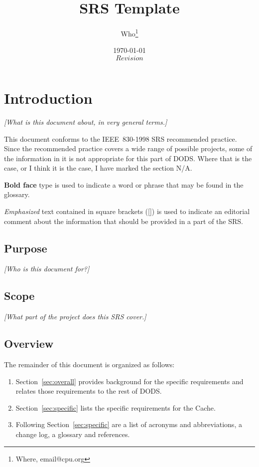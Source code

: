 \documentclass{article}
\begin{document}
\title{SRS Template}
\author{Who\thanks{Where, email@cpu.org}}
\date{\today \\ $Revision$ }



\maketitle
\tableofcontents


\section{Introduction}
\emph{[What is this document about, in very general terms.]}

This document conforms to the IEEE~830-1998 \ac{SRS} recommended practice.
Since the recommended practice covers a wide range of possible projects, some
of the information in it is not appropriate for this part of \acs{DODS}.
Where that is the case, or I think it is the case, I have marked the section
N/A.

\textbf{Bold face} type is used to indicate a word or phrase that may be
found in the glossary.

\emph{Emphasized} text contained in square brackets ([]) is used to indicate
an editorial comment about the information that should be provided in a part
of the \ac{SRS}.

\subsection{Purpose}
\emph{[Who is this document for?]}

\subsection{Scope}
\emph{[What part of the project does this SRS cover.]}

\subsection{Overview}

The remainder of this document is organized as follows:
\begin{enumerate}
\item Section~\ref{sec:overall} provides background for the specific
requirements and relates those requirements to the rest of DODS.
\item Section~\ref{sec:specific} lists the specific requirements for the
  Cache.
\item Following Section~\ref{sec:specific} are a list of acronyms and
  abbreviations, a change log, a glossary and references.
\end{enumerate}
\end{document}
